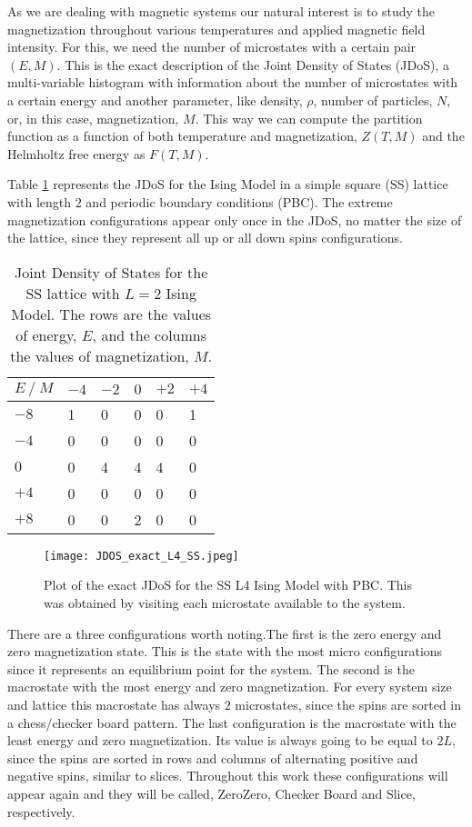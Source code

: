 As we are dealing with magnetic systems our natural interest is to study the magnetization throughout various temperatures and applied magnetic field intensity. For this, we need the number of microstates with a certain pair $(E,M)$. This is the exact description of the Joint Density of States (JDoS), a multi-variable histogram with information about the number of microstates with a certain energy and another parameter, like density, $\rho$, number of particles, $N$, or, in this case, magnetization, $M$. This way we can compute the partition function as a function of both temperature and magnetization, $Z(T,M)$ and the Helmholtz free energy as $F(T,M)$.

Table \ref{exact_L2} represents the JDoS for the Ising Model in a simple square (SS) lattice with length $2$ and periodic boundary conditions (PBC). The extreme magnetization configurations appear only once in the JDoS, no matter the size of the lattice, since they represent all up or all down spins configurations. 

\begin{table}[h]
\centering
\caption{Joint Density of States for the SS lattice with $L=2$ Ising Model. The rows are the values of energy, $E$, and the columns the values of magnetization, $M$.}
\label{exact_L2}
\begin{tabular}{l|lllll}
$E \ / \ M$ & $-4$ & $-2$ &  $0$ & $+2$ &  $+4$ \\ \hline
$-8$  & 1  & 0  & 0 & 0 & 1 \\
$-4$  & 0  & 0  & 0 & 0 & 0 \\
$0$   & 0  & 4  & 4 & 4 & 0 \\
$+4$   & 0  & 0  & 0 & 0 & 0 \\
$+8$   & 0  & 0  & 2 & 0 & 0
\end{tabular}
\end{table}

\begin{figure}[h]
	\centering
	\texttt{[image: JDOS\_exact\_L4\_SS.jpeg]}
	\caption{Plot of the exact JDoS for the SS L4 Ising Model with PBC. This was obtained by visiting each microstate available to the system.}
	\label{exact_L4}
\end{figure}

\pagebreak

There are a three configurations worth noting.The first is the zero energy and zero magnetization state. This is the state with the most micro configurations since it represents an equilibrium point for the system. The second is the macrostate with the most energy and zero magnetization. For every system size and lattice this macrostate has always $2$ microstates, since the spins are sorted in a chess/checker board pattern. The last configuration is the macrostate with the least energy and zero magnetization. Its value is always going to be equal to $2L$, since the spins are sorted in rows and columns of alternating positive and negative spins, similar to slices. Throughout this work these configurations will appear again and they will be called, ZeroZero, Checker Board and Slice, respectively. 

